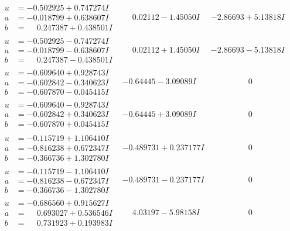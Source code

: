 \documentclass[1p]{elsarticle_modified}
\theoremstyle{definition}
\begin{document}
$$\begin{array}{c|c|c}
\begin{aligned}
u &= -0.502925 + 0.747274 I \\
a &= -0.018799 + 0.638607 I \\
b &= \phantom{-}0.247387 + 0.438501 I\end{aligned}
 & \phantom{-}0.02112 - 1.45050 I & -2.86693 + 5.13818 I \\ \hline\begin{aligned}
u &= -0.502925 - 0.747274 I \\
a &= -0.018799 - 0.638607 I \\
b &= \phantom{-}0.247387 - 0.438501 I\end{aligned}
 & \phantom{-}0.02112 + 1.45050 I & -2.86693 - 5.13818 I \\ \hline\begin{aligned}
u &= -0.609640 + 0.928743 I \\
a &= -0.602842 - 0.340623 I \\
b &= -0.607870 - 0.045415 I\end{aligned}
 & -0.64445 - 3.09089 I & \phantom{-0.000000 } 0 \\ \hline\begin{aligned}
u &= -0.609640 - 0.928743 I \\
a &= -0.602842 + 0.340623 I \\
b &= -0.607870 + 0.045415 I\end{aligned}
 & -0.64445 + 3.09089 I & \phantom{-0.000000 } 0 \\ \hline\begin{aligned}
u &= -0.115719 + 1.106410 I \\
a &= -0.816238 + 0.672347 I \\
b &= -0.366736 + 1.302780 I\end{aligned}
 & -0.489731 + 0.237177 I & \phantom{-0.000000 } 0 \\ \hline\begin{aligned}
u &= -0.115719 - 1.106410 I \\
a &= -0.816238 - 0.672347 I \\
b &= -0.366736 - 1.302780 I\end{aligned}
 & -0.489731 - 0.237177 I & \phantom{-0.000000 } 0 \\ \hline\begin{aligned}
u &= -0.686560 + 0.915627 I \\
a &= \phantom{-}0.693027 + 0.536546 I \\
b &= \phantom{-}0.731923 + 0.193983 I\end{aligned}
 & \phantom{-}4.03197 - 5.98158 I & \phantom{-0.000000 } 0 \\ \hline\begin{aligned}

\end{aligned}
\end{array}$$
\end{document}
